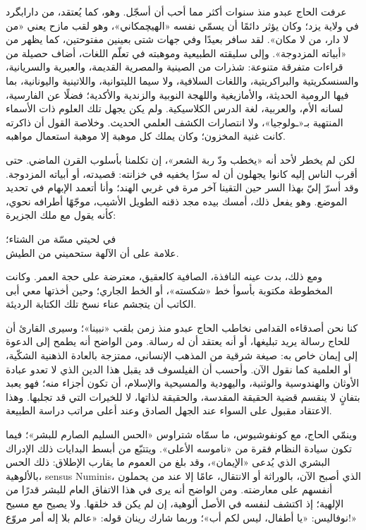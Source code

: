 

عرفت الحاج عبدو منذ سنوات أكثر مما أحب أن أسجّل. وهو، كما يُعتقد، من دارابگرد في ولاية يزد؛ وكان يؤثر دائمًا أن يسمّي نفسه «الهيچمكاني»، وهو لقب مازح يعني «من لا دار، من لا مكان». لقد سافر بعيدًا وفي جهات شتى بعينين مفتوحتين، كما يظهر من «أبياته المزدوجة». وإلى سليقته الطبيعية وموهبته في تعلّم اللغات، أضاف حصيلة من قراءات متفرقة متنوعة: شذرات من الصينية والمصرية القديمة، والعبرية والسريانية، والسنسكريتية والبراكريتية، واللغات السلافية، ولا سيما الليتوانية، واللاتينية واليونانية، بما فيها الرومية الحديثة، والأمازيغية واللهجة النوبية والزندية والأكدية؛ فضلًا عن الفارسية، لسانه الأم، والعربية، لغة الدرس الكلاسيكية. ولم يكن يجهل تلك العلوم ذات الأسماء المنتهية بـ«ـولوجيا»، ولا انتصارات الكشف العلمي الحديث. وخلاصة القول أن ذاكرته كانت غنية المخزون؛ وكان يملك كل موهبة إلا موهبة استعمال مواهبه.

لكن لم يخطر لأحد أنه «يخطب ودّ ربة الشعر»، إن تكلمنا بأسلوب القرن الماضي. حتى أقرب الناس إليه كانوا يجهلون أن له سرًا يخفيه في خزانته: قصيدته، أو أبياته المزدوجة. وقد أسرّ إليّ بهذا السر حين التقينا آخر مرة في غربي الهند؛ وأنا أتعمد الإبهام في تحديد الموضع. وهو يفعل ذلك، أمسك بيده مجد ذقنه الطويل الأشيب، موجّهًا أطرافه نحوي، كأنه يقول مع ملك الجزيرة:

\begin{SourceQuotation}
في لحيتي مسّة من الشتاء؛\\
علامة على أن الآلهة ستحميني من الطيش.
\end{SourceQuotation}

ومع ذلك، بدت عينه النافذة، الصافية كالعقيق، معترضة على حجة العمر. وكانت المخطوطة مكتوبة بأسوأ خط «شكسته»، أو الخط الجاري؛ وحين أخذتها معي أبى الكاتب أن يتجشم عناء نسخ تلك الكتابة الرديئة.

كنا نحن أصدقاءه القدامى نخاطب الحاج عبدو منذ زمن بلقب «نبينا»؛ وسيرى القارئ أن للحاج رسالة يريد تبليغها، أو أنه يعتقد أن له رسالة. ومن الواضح أنه يطمح إلى الدعوة إلى إيمان خاص به: صيغة شرقية من المذهب الإنساني، ممتزجة بالعادة الذهنية الشكّية، أو العلمية كما نقول الآن. وأحسب أن الفيلسوف قد يقبل هذا الدين الذي لا تعدو عبادة الأوثان والهندوسية والوثنية، واليهودية والمسيحية والإسلام، أن تكون أجزاء منه؛ فهو يعبد بتفانٍ لا ينقسم قضية الحقيقة المقدسة، والحقيقة لذاتها، لا للخيرات التي قد تجلبها. وهذا الاعتقاد مقبول على السواء عند الجهل الصادق وعند أعلى مراتب دراسة الطبيعة.

وينمّي الحاج، مع كونفوشيوس، ما سمّاه شتراوس «الحس السليم الصارم للبشر»؛ فيما تكون سيادة النظام فقرة من «ناموسه الأعلى». ويتتبّع من أبسط البدايات ذلك الإدراك البشري الذي يُدعى «الإيمان»، وقد بلغ من العموم ما يقارب الإطلاق: ذلك الحس بالألوهية، \textenglish{sensus Numinis}، الذي أصبح الآن، بالوراثة أو الانتقال، عامًا إلا عند من يحملون أنفسهم على معارضته. ومن الواضح أنه يرى في هذا الاتفاق العام للبشر قدرًا من الإلهية؛ إذ اكتشف لنفسه في الأصل ألوهية، إن لم يكن قد خلقها. ولا يصيح مع مسيح نوفاليس: «يا أطفال، ليس لكم أب»؛ وربما شارك رينان قوله: «عالم بلا إله أمر مروّع!»

